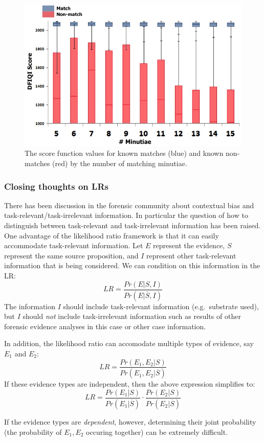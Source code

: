 \documentclass[]{book}
\theoremstyle{definition}
\theoremstyle{definition}
\theoremstyle{remark}
\begin{document}
\begin{figure}

{\centering \includegraphics[width=.5\linewidth]{img/dfscscore} 

}

\caption{The score function values for known matches (blue) and known non-matches (red) by the number of matching minutiae.}\label{fig:minutiae}
\end{figure}

\subsubsection{Closing thoughts on LRs}\label{closing-thoughts-on-lrs}

There has been discussion in the forensic community about contextual
bias and task-relevant/task-irrelevant information. In particular the
question of how to distinguish between task-relevant and task-irrelevant
information has been raised. One advantage of the likelihood ratio
framework is that it can easily accommodate task-relevant information.
Let \(E\) represent the evidence, \(S\) represent the same source
proposition, and \(I\) represent other task-relevant information that is
being considered. We can condition on this information in the LR:
\[LR = \frac{Pr(E|S,I)}{Pr(E|\overline{S},I)}\] The information \(I\)
should include task-relevant information (e.g.~substrate used), but
\(I\) should \emph{not} include task-irrelevant information such as
results of other forensic evidence analyses in this case or other case
information.

In addition, the likelihood ratio can accomodate multiple types of
evidence, say \(E_1\) and \(E_2\):
\[LR = \frac{Pr(E_1,E_2|S)}{Pr(E_1, E_2|\overline{S})}\] If these
evidence types are independent, then the above expression simplifies to:
\[LR = \frac{Pr(E_1|S)}{Pr(E_1|\overline{S})}\cdot \frac{Pr(E_2|S)}{Pr(E_2|\overline{S})}\]

If the evidence types are \emph{dependent}, however, determining their
joint probability (the probability of \(E_1,E_2\) occuring together) can
be extremely difficult.
\end{document}
